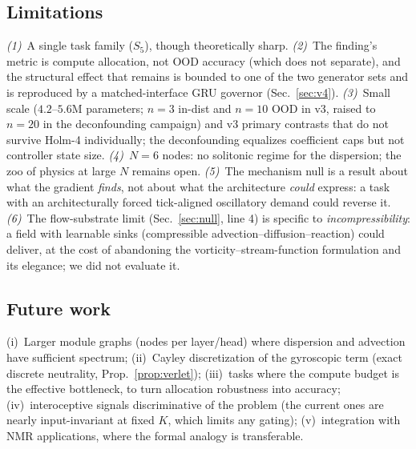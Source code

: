 \documentclass{article}
\begin{document}
\subsection{Limitations}
\emph{(1)}~A single task family ($S_5$), though theoretically sharp.
\emph{(2)}~The finding's metric is compute allocation, not OOD accuracy (which
does not separate), and the structural effect that remains is bounded to one
of the two generator sets and is reproduced by a matched-interface GRU
governor (Sec.~\ref{sec:v4}). \emph{(3)}~Small scale ($4.2$--$5.6$M
parameters; $n{=}3$ in-dist and $n{=}10$ OOD in v3, raised to $n{=}20$ in the
deconfounding campaign) and v3 primary contrasts that do not survive Holm-4
individually; the deconfounding equalizes coefficient caps but not controller
state size. \emph{(4)}~$N{=}6$ nodes: no solitonic regime for the dispersion;
the zoo of physics at large $N$ remains open. \emph{(5)}~The mechanism null is a
result about what the gradient \emph{finds}, not about what the architecture
\emph{could} express: a task with an architecturally forced tick-aligned
oscillatory demand could reverse it. \emph{(6)}~The flow-substrate limit
(Sec.~\ref{sec:null}, line 4) is specific to \emph{incompressibility}: a field
with learnable sinks (compressible advection--diffusion--reaction) could deliver,
at the cost of abandoning the vorticity--stream-function formulation and its
elegance; we did not evaluate it.

\subsection{Future work}
(i)~Larger module graphs (nodes per layer/head) where dispersion and advection
have sufficient spectrum; (ii)~Cayley discretization of the gyroscopic term
(exact discrete neutrality, Prop.~\ref{prop:verlet}); (iii)~tasks where the
compute budget is the effective bottleneck, to turn allocation robustness into
accuracy; (iv)~interoceptive signals discriminative of the problem (the current
ones are nearly input-invariant at fixed $K$, which limits any gating);
(v)~integration with NMR applications, where the formal analogy is transferable.

\end{document}
